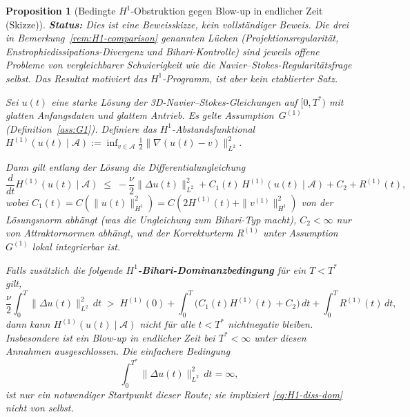 \documentclass[12pt,a4paper]{article}
\theoremstyle{definition}
\theoremstyle{plain}
\newtheorem{proposition}[definition]{Proposition}
\theoremstyle{remark}
\begin{document}
\begin{proposition}[Bedingte $H^1$-Obstruktion gegen Blow-up in endlicher Zeit (Skizze)]
\label{thm:H1-main}
\textbf{Status:} Dies ist eine \emph{Beweisskizze}, kein vollständiger
Beweis. Die drei in Bemerkung~\ref{rem:H1-comparison} genannten Lücken
(Projektionsregularität, Enstrophiedissipations-Divergenz und
Bihari-Kontrolle) sind jeweils offene Probleme von vergleichbarer
Schwierigkeit wie die Navier--Stokes-Regularitätsfrage selbst. Das Resultat
motiviert das $H^1$-Programm, ist aber kein etablierter Satz.

\medskip\noindent
Sei $u(t)$ eine starke Lösung der 3D-Navier--Stokes-Gleichungen auf
$[0,T^*)$ mit glatten Anfangsdaten und glattem Antrieb. Es gelte
Assumption~$G^{(1)}$ (Definition~\ref{ass:G1}). Definiere das
$H^1$-Abstandsfunktional
$H^{(1)}(u(t) \mid \mathcal{A})
:= \inf_{v \in \mathcal{A}} \tfrac{1}{2}\|\nabla(u(t)-v)\|_{L^2}^2$.

Dann gilt entlang der Lösung die Differentialungleichung
\begin{equation}\label{eq:H1-diff}
  \frac{d}{dt}H^{(1)}(u(t) \mid \mathcal{A})
  \;\le\;
  -\frac{\nu}{2}\|\Delta u(t)\|_{L^2}^2
  + C_1(t)\,H^{(1)}(u(t) \mid \mathcal{A})
  + C_2
  + R^{(1)}(t),
\end{equation}
wobei $C_1(t) = C(\|u(t)\|_{H^1}^2) = C(2H^{(1)}(t)
+ \|v^{(1)}\|_{H^1}^2)$ von der Lösungsnorm abhängt (was die
Ungleichung zum Bihari-Typ macht), $C_2 < \infty$ nur von
Attraktornormen abhängt,
und der Korrekturterm $R^{(1)}$ unter
Assumption~$G^{(1)}$ lokal integrierbar ist.

Falls zusätzlich die folgende \textbf{$H^1$-Bihari-Dominanzbedingung} für ein
$T<T^*$ gilt,
\begin{equation}\label{eq:H1-diss-dom}
  \frac{\nu}{2}\int_0^T\|\Delta u(t)\|_{L^2}^2\,dt
  \;>\;
  H^{(1)}(0)+\int_0^T\!\bigl(C_1(t)H^{(1)}(t)+C_2\bigr)\,dt
  +\int_0^T R^{(1)}(t)\,dt,
\end{equation}
dann kann $H^{(1)}(u(t) \mid \mathcal{A})$ nicht für alle
$t < T^*$ nichtnegativ bleiben. Insbesondere ist ein Blow-up in endlicher
Zeit bei $T^* < \infty$ unter diesen Annahmen ausgeschlossen. Die einfachere
Bedingung
\begin{equation}\label{eq:enstr-diss-div}
  \int_0^{T^*}\|\Delta u(t)\|_{L^2}^2\,dt = \infty,
\end{equation}
ist nur ein notwendiger Startpunkt dieser Route; sie impliziert
\eqref{eq:H1-diss-dom} nicht von selbst.
\end{proposition}
\end{document}
